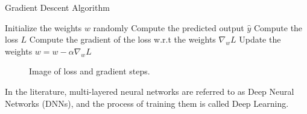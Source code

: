 \begin{algorithm}
\caption{Gradient Descent Algorithm}\label{alg:gradient_descent}
\begin{algorithmic}
    \State Initialize the weights $w$ randomly
        \State Compute the predicted output $\hat{y}$
        \State Compute the loss $L$
        \State Compute the gradient of the loss w.r.t the weights $\nabla_w L$
        \State Update the weights $w = w - \alpha \nabla_w L$
    \EndWhile
\end{algorithmic}
\end{algorithm}





\begin{figure}[ht]
    \begin{center}
        \fbox{\rule[-.5cm]{0cm}{4cm} \rule[-.5cm]{4cm}{0cm}}
    \end{center}
    \caption{Image of loss and gradient steps.}
    \label{fig:gradient_descent}
\end{figure}

In the literature, multi-layered neural networks are referred to as Deep Neural Networks (DNNs), and the process of training them is called Deep Learning.

%
%
%


